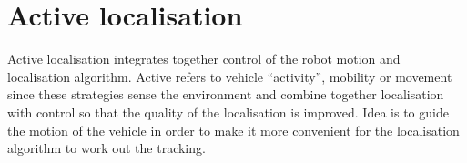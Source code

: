 \section{Active localisation} \label{sec:active-nav}
Active localisation integrates together control of the robot motion and localisation algorithm. Active refers to vehicle ``activity'', mobility or movement since these strategies sense the environment and combine together localisation with control so that the quality of the localisation is improved. Idea is to guide the motion of the vehicle in order to make it more convenient for the localisation algorithm to work out the tracking.
